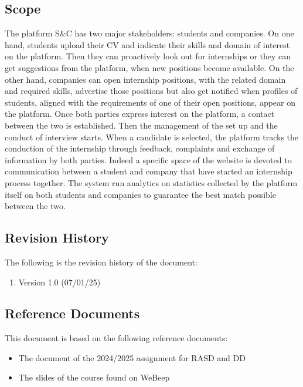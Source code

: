 
\subsection{Scope}
    The platform S\&C has two major stakeholders: students and companies. On one hand, students upload their CV and indicate their skills and domain of interest on the platform. Then they can proactively look out for internships or they can get suggestions from the platform, when new positions become available. On the other hand, companies can open internship positions, with the related domain and required skills, advertise those positions but also get notified when profiles of students, aligned with the requirements of one of their open positions, appear on the platform.
    Once both parties express interest on the platform, a contact between the two is established. Then the management of the set up and the conduct of interview starts. When a candidate is selected, the platform tracks the conduction of the internship through feedback, complaints and exchange of information by both parties. Indeed a specific space of the website is devoted to communication between a student and company that have started an internship process together. The system run analytics on statistics collected by the platform itself on both students and companies to guarantee the best match possible between the two.


\subsection{Revision History}
The following is the revision history of the document:
\begin{enumerate}
    \item Version 1.0 (07/01/25)
\end{enumerate}

\subsection{Reference Documents}
    This document is based on the following reference documents:
    \begin{itemize}
        \item {The document of the 2024/2025 assignment for RASD and DD }
        \item {The slides of the course found on WeBeep}
    \end{itemize}

